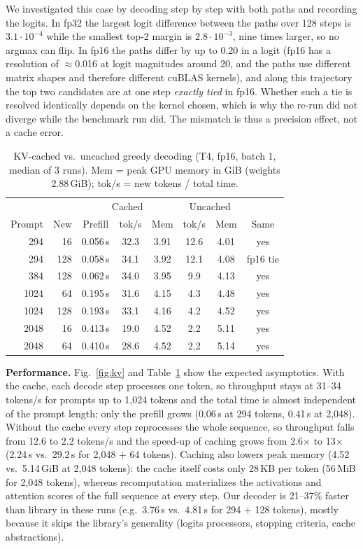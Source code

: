 We investigated this case by decoding step by step with both paths and recording the logits.
In fp32 the largest logit difference between the paths over 128 steps is $3.1\cdot10^{-4}$ while the
smallest top-2 margin is $2.8\cdot10^{-3}$, nine times larger, so no argmax can flip. In fp16 the
paths differ by up to 0.20 in a logit (fp16 has a resolution of $\approx$0.016 at logit magnitudes
around 20, and the paths use different matrix shapes and therefore different cuBLAS kernels), and
along this trajectory the top two candidates are at one step \emph{exactly tied} in fp16. Whether
such a tie is resolved identically depends on the kernel chosen, which is why the re-run did not
diverge while the benchmark run did. The mismatch is thus a precision effect, not a cache error.

\begin{table}[t]
\centering
\caption{KV-cached vs.\ uncached greedy decoding (T4, fp16, batch 1, median of 3 runs).
Mem = peak GPU memory in GiB (weights 2.88\,GiB); tok/s = new tokens / total time.}
\label{tab:kv}
\setlength{\tabcolsep}{2.5pt}
\begin{tabular}{rrcccccc}
\toprule
 & & \multicolumn{3}{c}{Cached} & \multicolumn{2}{c}{Uncached} & \\
Prompt & New & Prefill & tok/s & Mem & tok/s & Mem & Same \\
\midrule
294 & 16 & 0.056\,s & 32.3 & 3.91 & 12.6 & 4.01 & yes \\
294 & 128 & 0.058\,s & 34.1 & 3.92 & 12.1 & 4.08 & fp16 tie \\
384 & 128 & 0.062\,s & 34.0 & 3.95 & 9.9 & 4.13 & yes \\
1024 & 64 & 0.195\,s & 31.6 & 4.15 & 4.3 & 4.48 & yes \\
1024 & 128 & 0.193\,s & 33.1 & 4.16 & 4.2 & 4.52 & yes \\
2048 & 16 & 0.413\,s & 19.0 & 4.52 & 2.2 & 5.11 & yes \\
2048 & 64 & 0.410\,s & 28.6 & 4.52 & 2.2 & 5.14 & yes \\
\bottomrule
\end{tabular}
\end{table}

\textbf{Performance.} Fig.~\ref{fig:kv} and Table~\ref{tab:kv} show the expected asymptotics. With
the cache, each decode step processes one token, so throughput stays at 31--34 tokens/s for
prompts up to 1,024 tokens and the total time is almost independent of the prompt length; only the
prefill grows (0.06\,s at 294 tokens, 0.41\,s at 2,048). Without the cache every step reprocesses
the whole sequence, so throughput falls from 12.6 to 2.2 tokens/s and the speed-up of caching grows
from 2.6$\times$ to 13$\times$ (2.24\,s vs.\ 29.2\,s for 2,048 + 64 tokens). Caching also lowers peak
memory (4.52 vs.\ 5.14\,GiB at 2,048 tokens): the cache itself costs only 28\,KB per token
(56\,MiB for 2,048 tokens), whereas recomputation materializes the activations and attention
scores of the full sequence at every step. Our decoder is 21--37\% faster than library
 in these runs (e.g.\ 3.76\,s vs.\ 4.81\,s for 294 + 128 tokens), mostly because it
skips the library's generality (logits processors, stopping criteria, cache abstractions).

